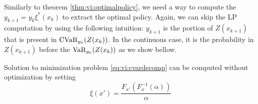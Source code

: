 Similarly to theorem \ref{thm:vi:optimalpolicy}, we need a way to compute the $y_{k+1}=y_{k}\xi^*(x_k)$ to extract the optimal policy. Again, we can skip the LP computation by using the following intuition: $y_{k+1}$ is the portion of $Z(x_{k+1})$ that is present in $\text{CVaR}_{y_k}(Z(x_k))$. In the continuous case, it is the probability in $Z(x_{k+1})$ before the $\text{VaR}_{y_k}(Z(x_k))$ as we show bellow.


\begin{theorem}
Solution to minimization problem \ref{eq:vi:cvardecomp} can be computed without optimization by setting
\begin{equation}\label{eq:xi-claim}
\xi ( x' ) = \dfrac{F_{x'}(F^{-1}_x(\alpha))}{\alpha} 
\end{equation}
\end{theorem}

